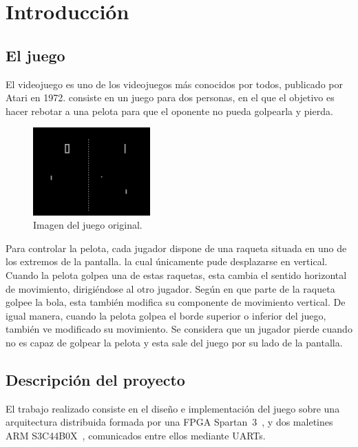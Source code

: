 \section{Introducción}
\label{s1:sec:Introduccion}

\subsection{El juego}
\label{s1:subsec:elJuego}
El videojuego \pong es uno de los videojuegos más conocidos por todos,
publicado por Atari en 1972. \pong consiste en un juego para dos personas,
en el que el objetivo es hacer rebotar a una pelota para que el oponente no
pueda golpearla y pierda.
\begin{figure}[h]
  \centering
  \includegraphics[width=0.4\textwidth]{images/pong.png}
  \caption{Imagen del juego original.}
  \label{s1:fig:pong}
\end{figure}

Para controlar la pelota, cada jugador dispone de una raqueta situada en
uno de los extremos de la pantalla. la cual únicamente pude desplazarse en
vertical. Cuando la pelota golpea una de estas raquetas, esta cambia el
sentido horizontal de movimiento, dirigiéndose al otro jugador. Según en
que parte de la raqueta golpee la bola, esta también modifica su componente
de movimiento vertical. De igual manera, cuando la pelota golpea el borde
superior o inferior del juego, también ve modificado su movimiento.  Se
considera que un jugador pierde cuando no es capaz de golpear la pelota y
esta sale del juego por su lado de la pantalla.


\subsection{Descripción del proyecto}
\label{s1:subsec:objetivos}
El trabajo realizado consiste en el diseño e implementación del juego \pong
sobre una arquitectura distribuida formada por una FPGA Spartan~3~\cite{Spartan3}, y
dos maletines ARM S3C44B0X~\cite{maletinARM}, comunicados entre ellos
mediante UARTs.

